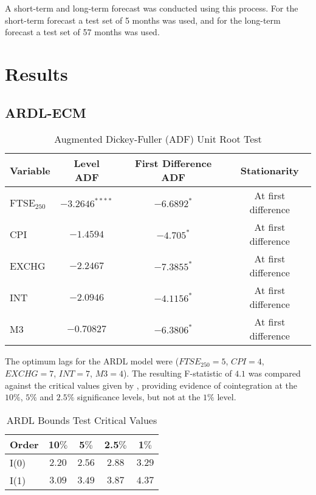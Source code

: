 \documentclass[11pt,a4paper]{article}
\newcommand{\citeboth}[1]{\citeauthor{#1} \citep{#1}}
\begin{document}
A short-term and long-term forecast was conducted using this process. For the short-term forecast a test set of 5 months was used, and for the long-term forecast a test set of 57 months was used.


\section{Results}
\label{sec: results}

\subsection{ARDL-ECM}

\begin{table}[h!]
    \centering
    \label{table: unitroot}
    \caption{Augmented Dickey-Fuller (ADF) Unit Root Test}
    \begin{tabular}{lccc}
        \toprule
        \textbf{Variable} & \textbf{Level ADF} & \textbf{First Difference ADF} & \textbf{Stationarity} \\
        \midrule
        FTSE$_{250}$ & $-3.2646^{****}$ & $-6.6892^{*}$ & At first difference \\
        CPI          & $-1.4594$ & $-4.705^{*}$ & At first difference \\
        EXCHG        & $-2.2467$ & $-7.3855^{*}$ & At first difference \\
        INT          & $-2.0946$ & $-4.1156^{*}$ & At first difference \\
        M3           & $-0.70827$ & $-6.3806^{*}$ & At first difference \\
        \bottomrule
    \end{tabular}
\end{table}


The optimum lags for the ARDL model were ($FTSE_{250} = 5$, $CPI = 4$, $EXCHG=7$, $INT =7$, $M3=4$). The resulting F-statistic of $4.1$ was compared against the critical values
given by \citeboth{pesaran2001}, providing evidence of cointegration 
at the $10\%$, $5\%$ and $2.5\%$ significance levels, but not at the $1\%$ 
level.

\begin{table}[h!]
    \centering
    \caption{ARDL Bounds Test Critical Values}
    \begin{tabular}{lcccc}
        \toprule
        \textbf{Order} & \textbf{10$\%$} & \textbf{5$\%$} & \textbf{2.5$\%$} & \textbf{1$\%$} \\
        \midrule
        I(0) & $2.20$ & $2.56$ & $2.88$ & $3.29$ \\
        I(1) & $3.09$ & $3.49$ & $3.87$  & $4.37$ \\
        \bottomrule
    \end{tabular}
\end{table}
\clearpage
\end{document}
